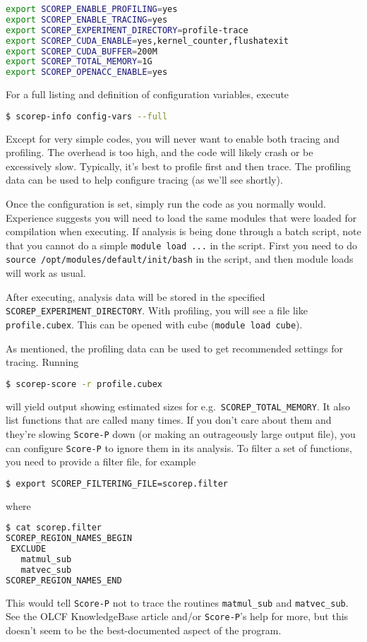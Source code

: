 \begin{lstlisting}[language=bash,mathescape=false]
export SCOREP_ENABLE_PROFILING=yes
export SCOREP_ENABLE_TRACING=yes
export SCOREP_EXPERIMENT_DIRECTORY=profile-trace
export SCOREP_CUDA_ENABLE=yes,kernel_counter,flushatexit
export SCOREP_CUDA_BUFFER=200M
export SCOREP_TOTAL_MEMORY=1G
export SCOREP_OPENACC_ENABLE=yes
\end{lstlisting}

For a full listing and definition of configuration variables, execute
\begin{lstlisting}[language=bash,mathescape=false]
$ scorep-info config-vars --full 
\end{lstlisting}

Except for very simple codes, you will never want to enable both tracing and
profiling.  The overhead is too high, and the code will likely crash or be
excessively slow.  Typically, it's best to profile first and then trace.  The
profiling data can be used to help configure tracing (as we'll see shortly).

Once the configuration is set, simply run the code as you normally would.
Experience suggests you will need to load the same modules that were loaded for
compilation when executing.  If analysis is being done through a batch script,
note that you cannot do a simple {\tt module load ...} in the script.  First you
need to do {\tt source /opt/modules/default/init/bash} in the script, and then
module loads will work as usual.

After executing, analysis data will be stored in the specified
{\tt SCOREP\_EXPERIMENT\_DIRECTORY}.  With profiling, you
will see a file like {\tt profile.cubex}.  This can be opened with cube 
({\tt module load cube}).  

As mentioned, the profiling data can be used to get recommended settings for
tracing.  Running
\begin{lstlisting}[language=bash,mathescape=false]
$ scorep-score -r profile.cubex
\end{lstlisting}
will yield output showing estimated sizes for e.g.~{\tt SCOREP\_TOTAL\_MEMORY}.
It also list functions that are called many times.  If you don't care about
them and they're slowing {\tt Score-P} down (or making an outrageously large output
file), you can configure {\tt Score-P} to ignore them in its analysis.  To filter a set
of functions, you need to provide a filter file, for example
\begin{lstlisting}[language=bash,mathescape=false]
$ export SCOREP_FILTERING_FILE=scorep.filter
\end{lstlisting}
where
\begin{lstlisting}[language=bash,mathescape=false]
$ cat scorep.filter
SCOREP_REGION_NAMES_BEGIN
 EXCLUDE
   matmul_sub
   matvec_sub
SCOREP_REGION_NAMES_END
\end{lstlisting}
This would tell {\tt Score-P} not to trace the routines {\tt matmul\_sub} and 
{\tt matvec\_sub}.  See the OLCF KnowledgeBase article and/or {\tt Score-P}'s
help for more, but this doesn't seem to be the best-documented aspect of the
program.


